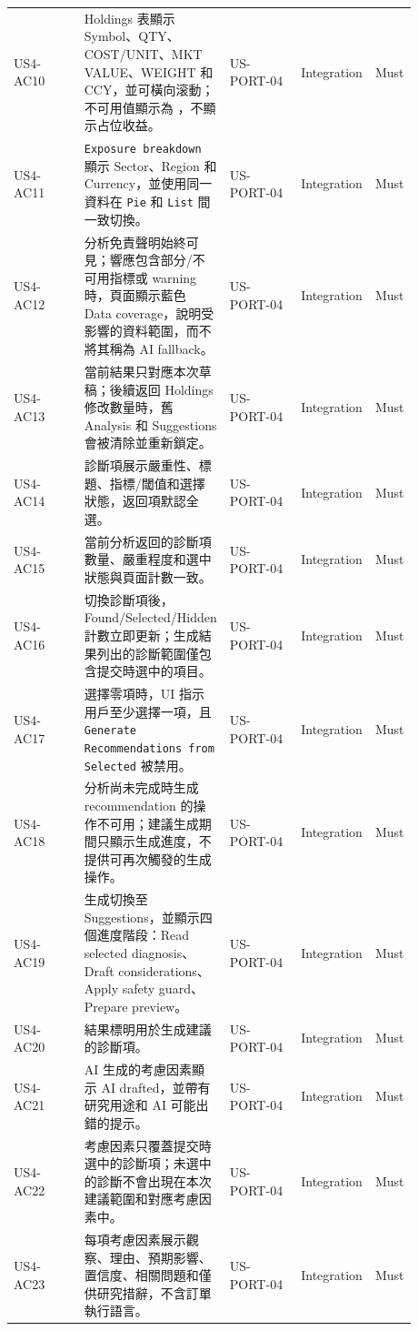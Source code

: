 \begin{longtable}{L{0.18\linewidth}L{0.30\linewidth}L{0.18\linewidth}L{0.12\linewidth}L{0.10\linewidth}}
US4-AC10 & Holdings 表顯示 Symbol、QTY、COST/\allowbreak{}UNIT、MKT VALUE、WEIGHT 和 CCY，並可橫向滚動；不可用值顯示為 \textemdash{}，不顯示占位收益。 & US-PORT-04 & Integration & Must \\
US4-AC11 & \texttt{Exposure breakdown} 顯示 Sector、Region 和 Currency，並使用同一資料在 \texttt{Pie} 和 \texttt{List} 間一致切換。 & US-PORT-04 & Integration & Must \\
US4-AC12 & 分析免責聲明始終可見；響應包含部分/\allowbreak{}不可用指標或 warning 時，頁面顯示藍色 Data coverage，說明受影響的資料範圍，而不將其稱為 AI fallback。 & US-PORT-04 & Integration & Must \\
US4-AC13 & 當前結果只對應本次草稿；後續返回 Holdings 修改數量時，舊 Analysis 和 Suggestions 會被清除並重新鎖定。 & US-PORT-04 & Integration & Must \\
US4-AC14 & 診斷項展示嚴重性、標題、指標/\allowbreak{}閾值和選擇狀態，返回項默認全選。 & US-PORT-04 & Integration & Must \\
US4-AC15 & 當前分析返回的診斷項數量、嚴重程度和選中狀態與頁面計數一致。 & US-PORT-04 & Integration & Must \\
US4-AC16 & 切換診斷項後，Found/\allowbreak{}Selected/\allowbreak{}Hidden 計數立即更新；生成結果列出的診斷範圍僅包含提交時選中的項目。 & US-PORT-04 & Integration & Must \\
US4-AC17 & 選擇零項時，UI 指示用戶至少選擇一項，且 \texttt{Generate Recommendations from  Selected} 被禁用。 & US-PORT-04 & Integration & Must \\
US4-AC18 & 分析尚未完成時生成 recommendation 的操作不可用；建議生成期間只顯示生成進度，不提供可再次觸發的生成操作。 & US-PORT-04 & Integration & Must \\
US4-AC19 & 生成切換至 Suggestions，並顯示四個進度階段：Read selected diagnosis、Draft considerations、Apply safety guard、Prepare preview。 & US-PORT-04 & Integration & Must \\
US4-AC20 & 結果標明用於生成建議的診斷項。 & US-PORT-04 & Integration & Must \\
US4-AC21 & AI 生成的考慮因素顯示 AI drafted，並帶有研究用途和 AI 可能出錯的提示。 & US-PORT-04 & Integration & Must \\
US4-AC22 & 考慮因素只覆蓋提交時選中的診斷項；未選中的診斷不會出現在本次建議範圍和對應考慮因素中。 & US-PORT-04 & Integration & Must \\
US4-AC23 & 每項考慮因素展示觀察、理由、預期影響、置信度、相關問題和僅供研究措辭，不含訂單執行語言。 & US-PORT-04 & Integration & Must \\

\end{longtable}
